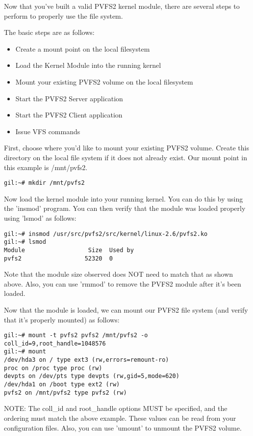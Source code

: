 \documentclass[11pt, letterpaper]{article}
\begin{document}
Now that you've built a valid PVFS2 kernel module, there are several
steps to perform to properly use the file system.

The basic steps are as follows:
\begin{itemize}
\item Create a mount point on the local filesystem
\item Load the Kernel Module into the running kernel
\item Mount your existing PVFS2 volume on the local filesystem
\item Start the PVFS2 Server application
\item Start the PVFS2 Client application
\item Issue VFS commands
\end{itemize}

First, choose where you'd like to mount your existing PVFS2 volume.
Create this directory on the local file system if it does not already
exist.  Our mount point in this example is /mnt/pvfs2.

\begin{verbatim}
gil:~# mkdir /mnt/pvfs2
\end{verbatim}

Now load the kernel module into your running kernel.  You can do this
by using the 'insmod' program.  You can then verify that the module
was loaded properly using 'lsmod' as follows:

\begin{verbatim}
gil:~# insmod /usr/src/pvfs2/src/kernel/linux-2.6/pvfs2.ko
gil:~# lsmod
Module                  Size  Used by
pvfs2                  52320  0 
\end{verbatim}

Note that the module size observed does NOT need to match that as
shown above.  Also, you can use 'rmmod' to remove the PVFS2 module
after it's been loaded.

Now that the module is loaded, we can mount our PVFS2 file system (and
verify that it's properly mounted) as follows:

\begin{verbatim}
gil:~# mount -t pvfs2 pvfs2 /mnt/pvfs2 -o coll_id=9,root_handle=1048576
gil:~# mount
/dev/hda3 on / type ext3 (rw,errors=remount-ro)
proc on /proc type proc (rw)
devpts on /dev/pts type devpts (rw,gid=5,mode=620)
/dev/hda1 on /boot type ext2 (rw)
pvfs2 on /mnt/pvfs2 type pvfs2 (rw)
\end{verbatim}

NOTE: The coll\_id and root\_handle options MUST be specified, and the
ordering must match the above example.  These values can be read from
your configuration files.  Also, you can use 'umount' to unmount the
PVFS2 volume.
\end{document}
